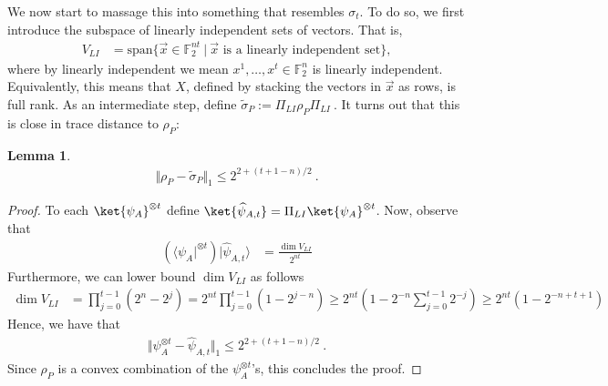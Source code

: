 \documentclass[11pt]{article}
\newtheorem{lemma}[theorem]{Lemma}
\newcommand{\F}{\mathbb{F}}
\begin{document}
We now start to massage this into something that resembles $\sigma_t$. To do so, we first introduce the subspace of linearly independent sets of vectors. That is,
\begin{align}
    V_{LI} & = \text{span}\{\vec{x} \in \F_2^{nt} \ \vert \ \vec{x} \text{ is a linearly independent set}\},
\end{align}
where by linearly independent we mean $x^1,\ldots,x^t \in \mathbb{F}_2^n$ is linearly independent. Equivalently, this means that $X$, defined by stacking the vectors in $\vec{x}$ as rows, is full rank. 
 As an intermediate step, define $ \tilde{\sigma}_P := \Pi_{LI} \rho_P \Pi_{LI}\ .$ 
It turns out that this is close in trace distance to $\rho_P$:
\begin{lemma}
    \begin{align}
        \Vert \rho_P - \tilde{\sigma}_P \Vert_1 \leq 2^{2+(t+1-n)/2}\ . 
    \end{align}
\end{lemma}
\begin{proof}
    To each $\ket{\psi_A}^{\otimes t}$ define $\ket{\widehat{\psi}_{A,t}}= \Pi_{LI}\ket{\psi_A}^{\otimes t}
    $. Now, observe that
    \begin{align}
        \left(\langle \psi_A\vert^{\otimes t}\right)\vert\widehat{\psi}_{A,t}\rangle & = \frac{\dim V_{LI}}{2^{nt}}
    \end{align}
     Furthermore, we can lower bound $\dim V_{LI}$ as follows
     \begin{align}
        \dim V_{LI} & = \prod_{j=0}^{t-1}(2^n - 2^j) = 2^{nt} \prod_{j=0}^{t-1}(1-2^{j-n}) \geq 2^{nt}\left(1-2^{-n}\sum_{j=0}^{t-1}2^{-j} \right)\geq 2^{nt}\left(1 - 2^{-n+t+1}\right)
    \end{align}
    Hence, we have that
    \begin{align}
        \Vert \psi_A^{\otimes t} - \widehat{\psi}_{A,t} \Vert_1 \leq 2^{2+(t+1-n)/2}\ .
    \end{align}
    Since $\rho_P$ is a convex combination of the $\psi_A^{\otimes t}$'s, this concludes the proof.
\end{proof}
\end{document}
